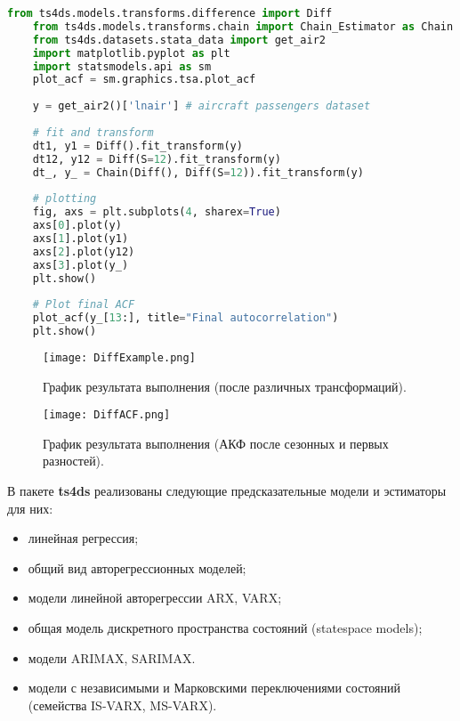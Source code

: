 \documentclass[a4paper,14pt]{extreport}
\begin{document}
	\begin{lstlisting}[language=Python]
	from ts4ds.models.transforms.difference import Diff
	from ts4ds.models.transforms.chain import Chain_Estimator as Chain
	from ts4ds.datasets.stata_data import get_air2
	import matplotlib.pyplot as plt
	import statsmodels.api as sm
	plot_acf = sm.graphics.tsa.plot_acf
	
	y = get_air2()['lnair'] # aircraft passengers dataset
	
	# fit and transform
	dt1, y1 = Diff().fit_transform(y)
	dt12, y12 = Diff(S=12).fit_transform(y)
	dt_, y_ = Chain(Diff(), Diff(S=12)).fit_transform(y)
	
	# plotting
	fig, axs = plt.subplots(4, sharex=True)
	axs[0].plot(y)
	axs[1].plot(y1)
	axs[2].plot(y12)
	axs[3].plot(y_)
	plt.show()
	
	# Plot final ACF
	plot_acf(y_[13:], title="Final autocorrelation")
	plt.show()
	\end{lstlisting}
	
	\begin{figure}
		\texttt{[image: DiffExample.png]}
		\caption{График результата выполнения (после различных трансформаций).}
		\label{fig:ts4ds-diffexample}
	\end{figure}
	\begin{figure}
		\texttt{[image: DiffACF.png]}
		\caption{График результата выполнения (АКФ после сезонных и первых разностей).}
		\label{fig:ts4ds-diffacf}
	\end{figure}
	
	
	В пакете \textbf{ts4ds} реализованы следующие предсказательные модели и эстиматоры для них:
	\begin{itemize}
		\item линейная регрессия;
		\item общий вид авторегрессионных моделей;
		\item модели линейной авторегрессии ARX, VARX;
		\item общая модель дискретного пространства состояний (statespace models);
		\item модели ARIMAX, SARIMAX.
		\item модели с независимыми и Марковскими переключениями состояний (семейства IS-VARX, MS-VARX).
	\end{itemize}
	
\end{document}

